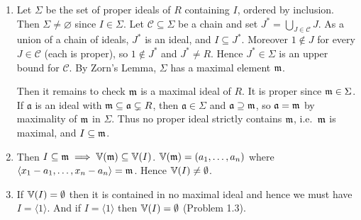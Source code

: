 \documentclass[Notebook.tex]{subfiles}
\begin{document}
\begin{solution}
    \bbni
    \begin{enumerate}
        \item Let $\Sigma$ be the set of proper ideals of $R$ containing $I$, ordered by inclusion. Then $\Sigma\neq\varnothing$ since $I\in\Sigma$. Let $\mathcal{C}\subseteq\Sigma$ be a chain and set $J^*=\bigcup_{J\in\mathcal{C}}J$. As a union of a chain of ideals, $J^*$ is an ideal, and $I\subseteq J^*$. Moreover $1\notin J$ for every $J\in\mathcal{C}$ (each is proper), so $1\notin J^*$ and $J^*\neq R$. Hence $J^*\in\Sigma$ is an upper bound for $\mathcal{C}$. By Zorn's Lemma, $\Sigma$ has a maximal element $\operatorname{\mathfrak{m}}$. 
        
        Then it remains to check $\operatorname{\mathfrak{m}}$ is a maximal ideal of $R$. It is proper since $\operatorname{\mathfrak{m}}\in\Sigma$. If $\mathfrak{a}$ is an ideal with $\operatorname{\mathfrak{m}}\subseteq\mathfrak{a} \subsetneq R$, then $\mathfrak{a}\in\Sigma$ and $\mathfrak{a}\supseteq\operatorname{\mathfrak{m}}$, so $\mathfrak{a}=\operatorname{\mathfrak{m}}$ by maximality of $\operatorname{\mathfrak{m}}$ in $\Sigma$. Thus no proper ideal strictly contains $\operatorname{\mathfrak{m}}$, i.e.\ $\operatorname{\mathfrak{m}}$ is maximal, and $I\subseteq\operatorname{\mathfrak{m}}$.

        \item Then $I \subseteq \operatorname{\mathfrak{m}} \implies \mathbb V(\operatorname{\mathfrak{m}}) \subseteq \mathbb V(I)$. $\mathbb V(\operatorname{\mathfrak{m}}) = (a_1, \ldots, a_n)$ where $\langle x_1 - a_1, \ldots, x_n - a_n \rangle = \operatorname{\mathfrak{m}}$. Hence $\mathbb V(I) \neq \emptyset$. 
        \item If $\mathbb V(I) = \emptyset$ then it is contained in no maximal ideal and hence we must have $I = \langle 1 \rangle$. And if $I = \langle 1 \rangle$ then $\mathbb V(I) = \emptyset$ (Problem 1.3).
    \end{enumerate}
\end{solution}

\newpage 
\end{document}
